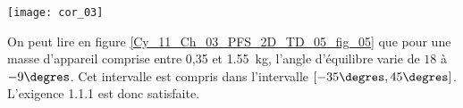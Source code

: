 \ifprof
\begin{marginfigure}
\texttt{[image: cor\_03]}
\end{marginfigure}
\begin{corrige} 

On peut lire en figure \ref{Cy_11_Ch_03_PFS_2D_TD_05_fig_05} que pour une masse d'appareil comprise entre 0,35 et \SI{1,55}{kg}, l'angle d'équilibre varie de $18$ à $-9\degres$. Cet intervalle est compris dans l'intervalle $\left[-35\degres,45\degres\right]$. L'exigence 1.1.1 est donc satisfaite.
\end{corrige}
\else
\fi

\ifprof
\else

%
%
\fi

